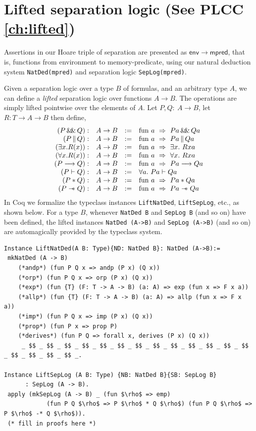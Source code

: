 \documentclass[12pt,fleqn,openany,oneside,showtrims]{memoir}
\newcommand{\ychapter}[2]{\chapter[#1]{#1 \hfill \normalsize #2}}
\begin{document}
\ychapter{Lifted separation logic}{(See PLCC \autoref{ch:lifted})}
Assertions in our Hoare triple of separation 
are presented as $\mathsf{env}\rightarrow
\mathsf{mpred}$, that is, functions from environment
to memory-predicate,
using our natural deduction system 
\lstinline{NatDed(mpred)} and separation logic
\lstinline{SepLog(mpred)}.

Given a separation logic over a type $B$ of formulas,
and an arbitrary type $A$, 
we can define a \emph{lifted} separation logic over functions $A \rightarrow B$.
The operations are simply lifted pointwise over the
elements of $A$.  Let $P,Q:~A\rightarrow B$,
let $R:T\rightarrow A \rightarrow B$ then define,
\[
\begin{array}{rccl}
(P \andp Q):& A\rightarrow B&:=& \mathrm{fun}~a~\Rightarrow~Pa \andp Qa\\
(P \orp Q):& A\rightarrow B&:=& \mathrm{fun}~a~\Rightarrow~Pa \orp Qa\\
(\exists x.R(x)):& A\rightarrow B&:=& \mathrm{fun}~a~\Rightarrow~\exists x.~Rxa\\
(\forall x.R(x)):& A\rightarrow B&:=& \mathrm{fun}~a~\Rightarrow~\forall x.~Rxa\\
(P \imp Q):& A\rightarrow B&:=& \mathrm{fun}~a~\Rightarrow~Pa \imp Qa\\
(P \vdash Q):& A\rightarrow B&:=& \forall a.~Pa \vdash Qa\\
(P * Q):& A\rightarrow B&:=& \mathrm{fun}~a~\Rightarrow~Pa * Qa\\
(P \wand Q):& A\rightarrow B&:=& \mathrm{fun}~a~\Rightarrow~Pa \wand Qa\\
\end{array}
\]
In Coq we formalize the typeclass instances
\lstinline{LiftNatDed},
\lstinline{LiftSepLog}, etc.,
as shown below.
For a type $B$, whenever \lstinline{NatDed B} and \lstinline{SepLog B} (and so on) have been defined, the lifted instances
\lstinline{NatDed (A->B)} and \lstinline{SepLog (A->B)} (and so on)
are automagically provided by the typeclass system.

\begin{lstlisting}
Instance LiftNatDed(A B: Type){ND: NatDed B}: NatDed (A->B):=
 mkNatDed (A -> B)
    (*andp*) (fun P Q x => andp (P x) (Q x))
    (*orp*) (fun P Q x => orp (P x) (Q x))
    (*exp*) (fun {T} (F: T -> A -> B) (a: A) => exp (fun x => F x a))
    (*allp*) (fun {T} (F: T -> A -> B) (a: A) => allp (fun x => F x a))
    (*imp*) (fun P Q x => imp (P x) (Q x))
    (*prop*) (fun P x => prop P)
    (*derives*) (fun P Q => forall x, derives (P x) (Q x))
     _ $$ _ $$ _ $$ _ $$ _ $$ _ $$ _ $$ _ $$ _ $$ _ $$ _ $$ _ $$ _ $$ _ $$ _ $$ _ $$ _ $$ _.

Instance LiftSepLog (A B: Type) {NB: NatDed B}{SB: SepLog B} 
      : SepLog (A -> B).
 apply (mkSepLog (A -> B) _ (fun $\rho$ => emp) 
            (fun P Q $\rho$ => P $\rho$ * Q $\rho$) (fun P Q $\rho$ => P $\rho$ -* Q $\rho$)).
 (* fill in proofs here *)
\end{lstlisting}
\end{document}
